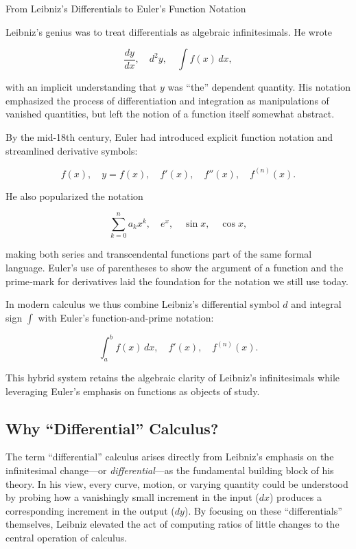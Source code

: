 \begin{HistoricalSidebar}{From Leibniz’s Differentials to Euler’s Function Notation}

  Leibniz’s genius was to treat differentials as algebraic infinitesimals. He wrote 

  \[
  \frac{dy}{dx},\quad d^2y,\quad \int f(x)\,dx,
  \]

  with an implicit understanding that \(y\) was “the” dependent quantity.  His notation emphasized the
  process of differentiation and integration as manipulations of vanished quantities, but left the 
   notion of a function itself somewhat abstract.

  \medskip
  
  By the mid-18th century, Euler had introduced explicit function notation and streamlined derivative symbols:

  \[
  f(x), \quad y = f(x), \quad f'(x), \quad f''(x), \quad f^{(n)}(x).
  \]

  He also popularized the notation

  \[
  \sum_{k=0}^n a_k x^k,\quad e^x,\quad \sin x,\quad \cos x,
  \]

  making both series and transcendental functions part of the same formal language.  Euler’s use of parentheses 
  to show the argument of a function and the prime‐mark for derivatives laid the foundation for the 
  notation we still use today.

  \medskip
  
  In modern calculus we thus combine Leibniz’s differential symbol \(d\) and integral sign \(\int\) with Euler’s 
  function-and-prime notation:

  \[
  \int_a^b f(x)\,dx,\quad f'(x),\quad f^{(n)}(x).
  \]

  This hybrid system retains the algebraic clarity of Leibniz’s infinitesimals while leveraging Euler’s emphasis 
  on functions as objects of study.
\end{HistoricalSidebar}


\subsection{Why “Differential” Calculus?}

The term “differential” calculus arises directly from Leibniz’s emphasis on the infinitesimal change—or \emph{differential}—as the fundamental building block of his theory.  In his view, every curve, motion, or varying quantity could be understood by probing how a vanishingly small increment in the input (\(dx\)) produces a corresponding increment in the output (\(dy\)).  By focusing on these “differentials” themselves, Leibniz elevated the act of computing ratios of little changes to the central operation of calculus.

